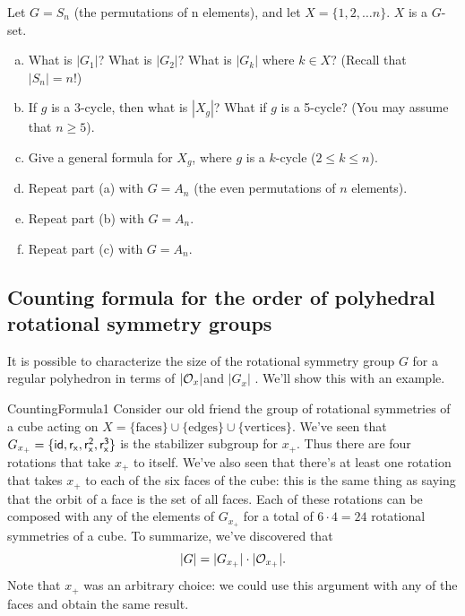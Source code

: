 \begin{exercise}{}
Let $G = S_n$ (the permutations of n elements), and let $X = \{1,2,\ldots n \}$.  $X$ is a $G$-set.
\begin{enumerate}[(a)]
\item
What is $|G_1|$? What is $|G_2|$? What is $|G_k|$ where $k \in X$?  (Recall that $|S_n| = n!$)
\item
If $g$ is a $3$-cycle, then what is $|X_g|$? What if $g$  is a 5-cycle?  (You may assume that $n \ge 5$).
\item
Give a general formula for $X_g$, where $g$ is a $k$-cycle ($2 \le k \le n$).
\item
Repeat part (a) with $G = A_n$ (the even permutations of $n$ elements).
\item
Repeat part (b) with $G = A_n$.
\item
Repeat part (c) with $G = A_n$.
\end{enumerate}
\end{exercise}


\subsection{Counting formula for the order of  polyhedral rotational symmetry groups}

It is possible to characterize the size of the rotational symmetry group $G$ for a regular polyhedron in terms of $|{\cal O}_x|$and $|G_x|$ . We'll show this with an example.

\begin{example}{CountingFormula1} 
Consider our old friend the group of rotational symmetries of a cube acting on $X=\{\text{faces}\}\cup\{\text{edges}\}\cup\{\text{vertices}\}$. We've seen that $G_{x_+}=\{\sf{id},r_x,r_x^2,r_x^3\}$ is the stabilizer subgroup for $x_+$.  Thus there are four rotations that take $x_+$ to itself.  We've also seen that there's at least one rotation that takes $x_+$ to each of the six faces of the cube:  this is the same thing as saying that the orbit of a face is the set of all faces.  Each of these rotations can be composed with any of the elements of $G_{x_+}$ for a total of $6\cdot 4=24$ rotational symmetries of a cube.  To summarize, we've discovered that 
$$|G|=|G_{x_+}|\cdot |{\cal O}_{x_+}|.$$
Note that $x_+$ was an arbitrary choice: we could use this argument with any of the faces and obtain the same result.
\end{example}

